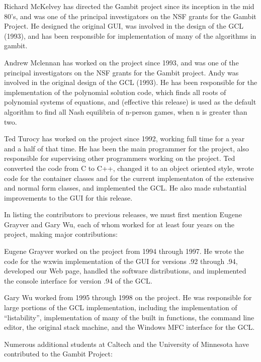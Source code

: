 Richard McKelvey has directed the Gambit project since its inception
in the mid 80's, and was one of the principal investigators on the NSF
grants for the Gambit Project.  He designed the original GUI, was
involved in the design of the GCL (1993), and has been responsible for
implementation of many of the algorithms in gambit.

Andrew Mclennan has worked on the project since 1993, and was one of
the principal investigators on the NSF grants for the Gambit project.
Andy was involved in the original design of the GCL (1993).  He has
been responsible for the implementation of the polynomial solution
code, which finds all roots of polynomial systems of equations, and
(effective this release) is used as the default algorithm to find all
Nash equilibria of n-person games, when n is greater than two.

Ted Turocy has worked on the project since 1992, working full time for
a year and a half of that time.  He has been the main programmer for
the project, also responsible for supervising other programmers
working on the project.  Ted converted the code from C to C++, changed
it to an object oriented style, wrote code for the container classes
and for the current implementaton of the extensive and normal form
classes, and implemented the GCL.  He also made substantial
improvements to the GUI for this release.

In listing the contributors to previous releases, we must
first mention Eugene Grayver and Gary Wu, each of whom worked
for at least four years on the project, making major contributions:

Eugene Grayver worked on the project from 1994 through 1997.
He wrote the code for the wxwin implementation of the GUI for versions
.92 through .94, developed our Web page, handled the software
distributions, and implemented the console interface for version .94
of the GCL.

Gary Wu worked from 1995 through 1998 on the project.  He was
responsible for large portions of the GCL implementation, including
the implementation of ``listability'', implementation of many of the
built in functions, the command line editor, the original stack
machine, and the Windows MFC interface for the GCL.

Numerous additional students at Caltech and the University of Minnesota
have contributed to the Gambit Project:

